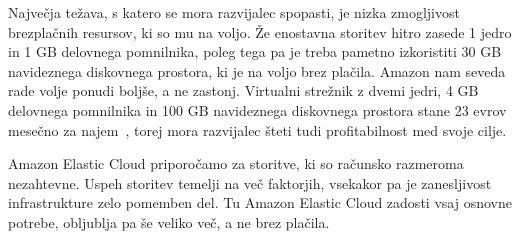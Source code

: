 Največja težava, s katero se mora razvijalec spopasti, je nizka zmogljivost brezplačnih resursov, ki so mu na voljo.
Že enostavna storitev hitro zasede 1 jedro in 1 GB delovnega pomnilnika, poleg tega pa je treba pametno izkoristiti 30 GB navideznega diskovnega prostora, ki je na voljo brez plačila.
Amazon nam seveda rade volje ponudi boljše, a ne zastonj.
Virtualni strežnik z dvemi jedri, 4 GB delovnega pomnilnika in 100 GB navideznega diskovnega prostora stane 23 evrov mesečno za najem~\cite{1_aws_pricing}, torej mora razvijalec šteti tudi profitabilnost med svoje cilje.

Amazon Elastic Cloud priporočamo za storitve, ki so računsko razmeroma nezahtevne.
Uspeh storitev temelji na več faktorjih, vsekakor pa je zanesljivost infrastrukture zelo pomemben del.
Tu Amazon Elastic Cloud zadosti vsaj osnovne potrebe, obljublja pa še veliko več, a ne brez plačila.


